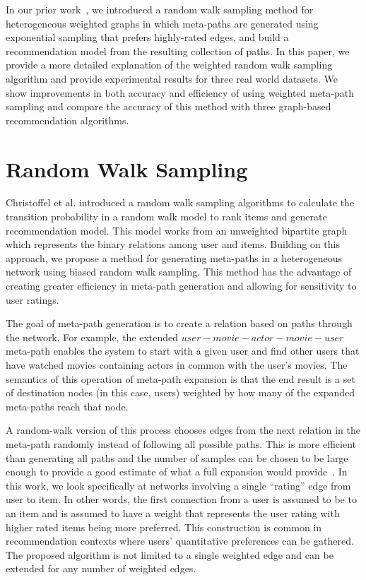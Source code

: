 \documentclass {acmart}
\begin{document}
In our prior work~\cite{vahedian2016weighted}, we introduced a random walk sampling method for heterogeneous weighted graphs in which meta-paths are generated using exponential sampling that prefers highly-rated edges, and build a recommendation model from the resulting collection of paths. In this paper, we provide a more detailed explanation of the weighted random walk sampling algorithm and provide experimental results for three real world datasets. We show improvements in both accuracy and efficiency of using weighted meta-path sampling and compare the accuracy of this method with three graph-based recommendation algorithms. 

\section{Random Walk Sampling}	
\noindent Christoffel et al.\cite{Christoffel:2015:BWA:2792838.2800180} introduced a random walk sampling algorithms to calculate the transition probability in a random walk model to rank items and generate recommendation model. This model works from an unweighted bipartite graph which represents the binary relations among user and items. Building on this approach, we propose a method for generating meta-paths in a heterogeneous network using biased random walk sampling. This method has the advantage of creating greater efficiency in meta-path generation and allowing for sensitivity to user ratings.

The goal of meta-path generation is to create a relation based on paths through the network. For example, the extended $user-movie-actor-movie-user$ meta-path enables the system to start with a given user and find other users that have watched movies containing actors in common with the user's movies. The semantics of this operation of meta-path expansion is that the end result is a set of destination nodes (in this case, users) weighted by how many of the expanded meta-paths reach that node. 

A random-walk version of this process chooses edges from the next relation in the meta-path randomly instead of following all possible paths. This is more efficient than generating all paths and the number of samples can be chosen to be large enough to provide a good estimate of what a full expansion would provide~\cite{Christoffel:2015:BWA:2792838.2800180}. In this work, we look specifically at networks involving a single ``rating'' edge from user to item. In other words, the first connection from a user is assumed to be to an item and is assumed to have a weight that represents the user rating with higher rated items being more preferred. This construction is common in recommendation contexts where users' quantitative preferences can be gathered. The proposed algorithm is not limited to a single weighted edge and can be extended for any number of weighted edges.
\end{document}
